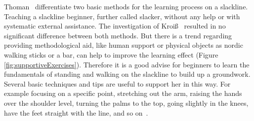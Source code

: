 Thoman~\cite{Thomann2013-aa} differentiate two basic methods for the learning process on a slackline. Teaching a slackline beginner, further called slacker, without any help or with systematic external assistance. The investigation of Kroiß~\cite{Kroiss2007-ab} resulted in no significant difference between both methods. But there is a trend regarding providing methodological aid, like human support or physical objects as nordic walking sticks or a bar, can help to improve the learning effect (Figure \ref{fig:supportiveExercises}). Therefore it is a good advise for beginners to learn the fundamentals of standing and walking on the slackline to build up a groundwork. Several basic techniques and tips are useful to support her in this way. For example focusing on a specific point, stretching out the arm, raising the hands over the shoulder level, turning the palms to the top, going slightly in the knees, have the feet straight with the line, and so on~\cite{Kleindl2011-bl, Kroiss2007-ab}.

